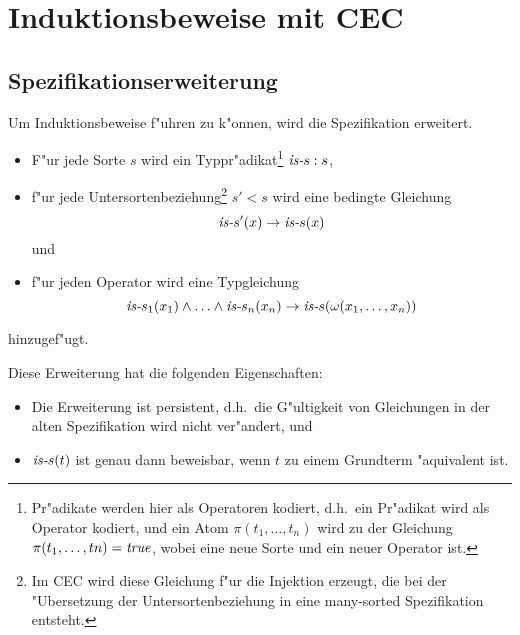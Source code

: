 


\newcommand{\cand}{\wedge}



\section{Induktionsbeweise mit CEC}

\subsection{Spezifikationserweiterung}

Um Induktionsbeweise f"uhren zu k"onnen, wird die Spezifikation erweitert.
\begin{itemize}
\item F"ur jede Sorte $s$ wird ein Typpr"adikat\footnote{
      Pr"adikate werden hier als Operatoren kodiert, d.h.\ ein Pr"adikat
       wird als Operator
       kodiert, und
      ein Atom \( \pi(t_1,\ldots,t_n) \) wird zu der Gleichung
      \( \pi(t_1,\ldots,tn) = {\it {true}} \),
      wobei  eine neue Sorte und 
       ein neuer Operator ist.
      }
      \( \preddecl{\tp{s}}{s} \),
\item f"ur jede Untersortenbeziehung\footnote{
      Im CEC wird diese Gleichung f"ur die Injektion
      erzeugt, die bei der "Ubersetzung der Untersortenbeziehung 
      in eine many-sorted Spezifikation entsteht.
      }
      $s'<s$ wird eine bedingte Gleichung
      \[ \clause{\tp{s'}(x)}{\tp{s}(x)} \]
      und
\item f"ur jeden Operator 
      wird eine Typgleichung
      \[ \clause{\tp{s_1}(x_1) \cand \ldots \cand \tp{s_n}(x_n)}
                {\tp{s}(\omega(x_1,\ldots,x_n))}
      \]
\end{itemize}
hinzugef"ugt.

Diese Erweiterung hat die folgenden Eigenschaften:
\begin{itemize}
\item Die Erweiterung ist persistent, d.h.\ die G"ultigkeit von Gleichungen
      in der alten Spezifikation wird nicht ver"andert, und
\item \( \tp{s}(t) \) ist genau dann beweisbar, wenn $t$ zu einem Grundterm 
      "aquivalent ist.
\end{itemize}


